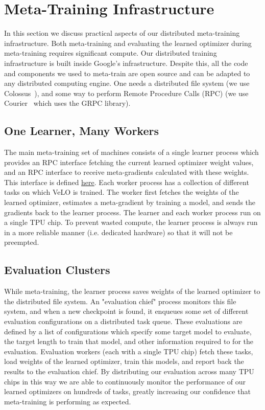 \documentclass[11pt]{article}
\begin{document}
\section{Meta-Training Infrastructure}
\label{sec:infra}
In this section we discuss practical aspects of our distributed meta-training infrastructure. 
Both meta-training and evaluating the learned optimizer during meta-training requires significant compute.
Our distributed training infrastructure is built inside Google's infrastructure.
Despite this, all the code and components we used to meta-train are open source and can be adapted to any distributed computing engine.
One needs a distributed file system (we use Colossus~\citep{dean2010evolution}), and some way to perform Remote Procedure Calls (RPC) (we use Courier~\citep{yang2021launchpad} which uses the GRPC library). 


\subsection{One Learner, Many Workers} \label{app:learner_worker}
The main meta-training set of machines consists of a single learner process which provides an RPC interface fetching the current learned optimizer weight values, and an RPC interface to receive meta-gradients calculated with these weights. This interface is defined \href{https://github.com/google/learned_optimization/blob/10574578689feabc8677ac4aab100f7bb4e777c2/learned_optimization/distributed.py}{here}.
Each worker process has a collection of different tasks on which VeLO is trained. 
The worker first fetches the weights of the learned optimizer, estimates a meta-gradient by training a model, and sends the gradients back to the learner process.
The learner and each worker process run on a single TPU chip.
To prevent wasted compute, the learner process is always run in a more reliable manner (i.e. dedicated hardware) so that it will not be preempted.

\subsection{Evaluation Clusters}
While meta-training, the learner process saves weights of the learned optimizer to the distributed file system.
An "evaluation chief" process monitors this file system, and when a new checkpoint is found, it enqueues some set of different evaluation configurations on a distributed task queue. These evaluations are defined by a list of configurations which specify some target model to evaluate, the target length to train that model, and other information required to for the evaluation.
Evaluation workers (each with a single TPU chip) fetch these tasks, load weights of the learned optimizer, train this models, and report back the results to the evaluation chief.
By distributing our evaluation across many TPU chips in this way we are able to continuously monitor the performance of our learned optimizers on hundreds of tasks, greatly increasing our confidence that meta-training is performing as expected.
\end{document}
